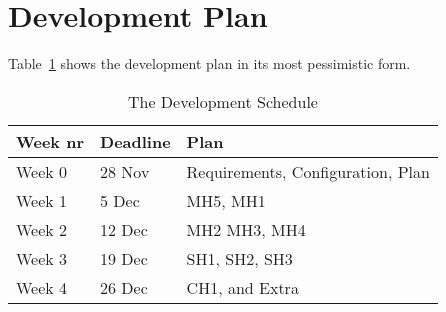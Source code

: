 \documentclass{scrartcl}
\begin{document}
\section{Development Plan}
Table~\ref{tab:plan} shows the development plan in its most pessimistic form.
\begin{table}[hb]
	\centering
	\begin{tabular}{|l|l|l|}
		\hline
		Week nr & Deadline & Plan \\\hline
		Week 0 & 28 Nov & Requirements, Configuration, Plan \\\hline
		Week 1 & 5 Dec & MH5, MH1 \\\hline
		Week 2 & 12 Dec & MH2 MH3, MH4 \\\hline
		Week 3 & 19 Dec & SH1, SH2, SH3 \\\hline
		Week 4 & 26 Dec & CH1, and Extra \\\hline
	\end{tabular}
	\caption{The Development Schedule}
	\label{tab:plan}
\end{table}
\end{document}

